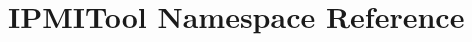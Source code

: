 \hypertarget{namespaceIPMITool}{\section{I\-P\-M\-I\-Tool Namespace Reference}
\label{namespaceIPMITool}
}
